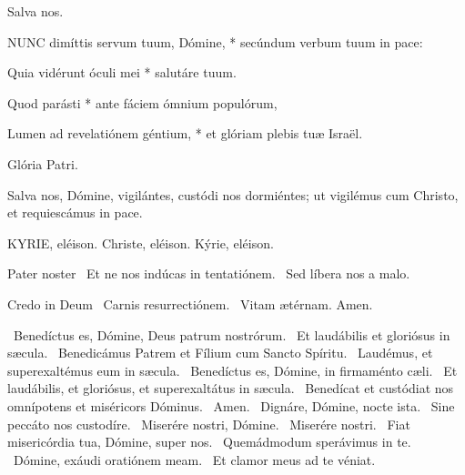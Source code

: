  Salva nos.


\lettrine[lines=2]{N}{UNC} dimíttis servum tuum, Dómine, * secúndum verbum tuum in pace:

Quia vidérunt óculi mei * salutáre tuum.

Quod parásti * ante fáciem ómnium populórum,

Lumen ad revelatiónem géntium, * et glóriam plebis tuæ Israël.

Glória Patri.

 Salva nos, Dómine, vigilántes, custódi nos dormiéntes; ut vigilémus cum Christo, et requiescámus in pace.



KYRIE, eléison. Christe, eléison. Kýrie, eléison.

Pater noster  \V\ Et ne nos indúcas in tentatiónem. \R\ Sed líbera nos a malo.

Credo in Deum  \V\ Carnis resurrectiónem. \R\ Vitam ætérnam. Amen.

\V\ Benedíctus es, Dómine, Deus patrum nostrórum. \R\ Et laudábilis et gloriósus in sæcula. \V\ Benedicámus Patrem et Fílium cum Sancto Spíritu. \R\ Laudémus, et superexaltémus eum in sæcula. \V\ Benedíctus es, Dómine, in firmaménto cæli. \R\ Et laudábilis, et gloriósus, et superexaltátus in sæcula. \V\ Benedícat et custódiat nos omnípotens et miséricors Dóminus. \R\ Amen. \V\ Dignáre, Dómine, nocte ista. \R\ Sine peccáto nos custodíre. \V\ Miserére nostri, Dómine. \R\ Miserére nostri. \V\ Fiat misericórdia tua, Dómine, super nos. \R\ Quemádmodum sperávimus in te. \V\ Dómine, exáudi oratiónem meam. \R\ Et clamor meus ad te véniat.


